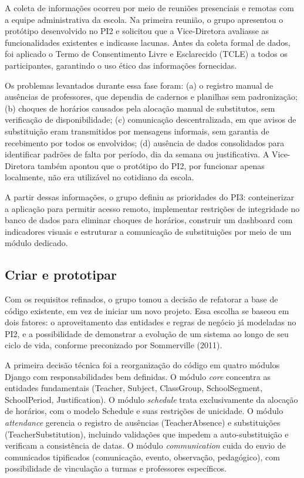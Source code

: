 A coleta de informações ocorreu por meio de reuniões presenciais e remotas com a equipe administrativa da escola. Na primeira reunião, o grupo apresentou o protótipo desenvolvido no PI2 e solicitou que a Vice-Diretora avaliasse as funcionalidades existentes e indicasse lacunas. Antes da coleta formal de dados, foi aplicado o Termo de Consentimento Livre e Esclarecido (TCLE) a todos os participantes, garantindo o uso ético das informações fornecidas.

Os problemas levantados durante essa fase foram: (a) o registro manual de ausências de professores, que dependia de cadernos e planilhas sem padronização; (b) choques de horários causados pela alocação manual de substitutos, sem verificação de disponibilidade; (c) comunicação descentralizada, em que avisos de substituição eram transmitidos por mensagens informais, sem garantia de recebimento por todos os envolvidos; (d) ausência de dados consolidados para identificar padrões de falta por período, dia da semana ou justificativa. A Vice-Diretora também apontou que o protótipo do PI2, por funcionar apenas localmente, não era utilizável no cotidiano da escola.

A partir dessas informações, o grupo definiu as prioridades do PI3: conteinerizar a aplicação para permitir acesso remoto, implementar restrições de integridade no banco de dados para eliminar choques de horários, construir um dashboard com indicadores visuais e estruturar a comunicação de substituições por meio de um módulo dedicado.

\subsection{Criar e prototipar}

Com os requisitos refinados, o grupo tomou a decisão de refatorar a base de código existente, em vez de iniciar um novo projeto. Essa escolha se baseou em dois fatores: o aproveitamento das entidades e regras de negócio já modeladas no PI2, e a possibilidade de demonstrar a evolução de um sistema ao longo de seu ciclo de vida, conforme preconizado por Sommerville (2011).

A primeira decisão técnica foi a reorganização do código em quatro módulos Django com responsabilidades bem definidas. O módulo \textit{core} concentra as entidades fundamentais (Teacher, Subject, ClassGroup, SchoolSegment, SchoolPeriod, Justification). O módulo \textit{schedule} trata exclusivamente da alocação de horários, com o modelo Schedule e suas restrições de unicidade. O módulo \textit{attendance} gerencia o registro de ausências (TeacherAbsence) e substituições (TeacherSubstitution), incluindo validações que impedem a auto-substituição e verificam a consistência de datas. O módulo \textit{communication} cuida do envio de comunicados tipificados (comunicação, evento, observação, pedagógico), com possibilidade de vinculação a turmas e professores específicos.

